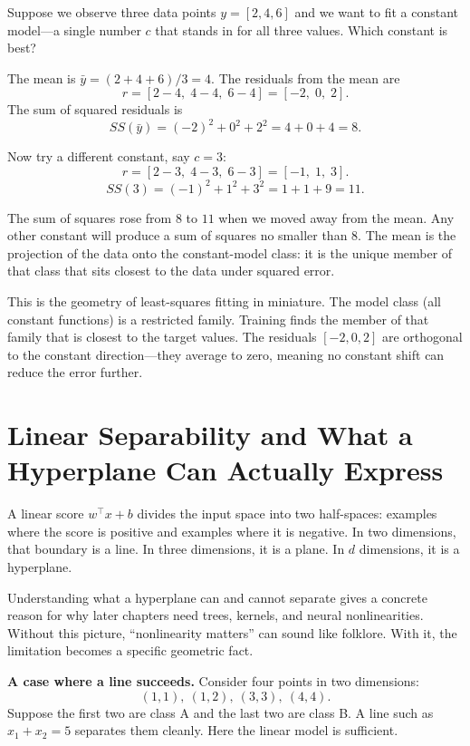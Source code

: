 \begin{example}
Suppose we observe three data points \(y = [2, 4, 6]\) and we want to fit a constant model---a single number \(c\) that stands in for all three values. Which constant is best?

The mean is \(\bar{y} = (2 + 4 + 6)/3 = 4\). The residuals from the mean are
\[
r = [2 - 4,\; 4 - 4,\; 6 - 4] = [-2,\; 0,\; 2].
\]
The sum of squared residuals is
\[
SS(\bar{y}) = (-2)^2 + 0^2 + 2^2 = 4 + 0 + 4 = 8.
\]

Now try a different constant, say \(c = 3\):
\[
r = [2-3,\; 4-3,\; 6-3] = [-1,\; 1,\; 3].
\]
\[
SS(3) = (-1)^2 + 1^2 + 3^2 = 1 + 1 + 9 = 11.
\]

The sum of squares rose from \(8\) to \(11\) when we moved away from the mean. Any other constant will produce a sum of squares no smaller than \(8\). The mean is the projection of the data onto the constant-model class: it is the unique member of that class that sits closest to the data under squared error.

This is the geometry of least-squares fitting in miniature. The model class (all constant functions) is a restricted family. Training finds the member of that family that is closest to the target values. The residuals \([-2, 0, 2]\) are orthogonal to the constant direction---they average to zero, meaning no constant shift can reduce the error further.
\end{example}

\section*{Linear Separability and What a Hyperplane Can Actually Express}

A linear score $w^\top x + b$ divides the input space into two half-spaces: examples where the score is positive and examples where it is negative. In two dimensions, that boundary is a line. In three dimensions, it is a plane. In $d$ dimensions, it is a hyperplane.

Understanding what a hyperplane can and cannot separate gives a concrete reason for why later chapters need trees, kernels, and neural nonlinearities. Without this picture, ``nonlinearity matters'' can sound like folklore. With it, the limitation becomes a specific geometric fact.

\textbf{A case where a line succeeds.} Consider four points in two dimensions:
\[
(1,1),\ (1,2),\ (3,3),\ (4,4).
\]
Suppose the first two are class A and the last two are class B. A line such as $x_1 + x_2 = 5$ separates them cleanly. Here the linear model is sufficient.

